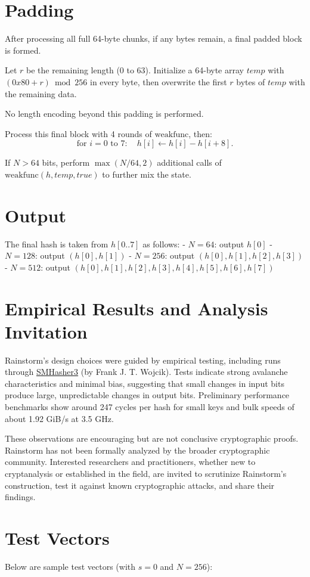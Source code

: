 \documentclass[11pt,a4paper]{article}
\begin{document}
\section*{Padding}
After processing all full 64-byte chunks, if any bytes remain, a final padded block is formed.

Let $r$ be the remaining length (0 to 63). Initialize a 64-byte array $temp$ with $(0x80 + r) \bmod 256$ in every byte, then overwrite the first $r$ bytes of $temp$ with the remaining data.

No length encoding beyond this padding is performed.

Process this final block with 4 rounds of $\text{weakfunc}$, then:
\[
\text{for } i=0 \text{ to } 7:\quad h[i] \leftarrow h[i] - h[i+8].
\]

If $N > 64$ bits, perform $\max(N/64, 2)$ additional calls of $\text{weakfunc}(h, temp, true)$ to further mix the state.

\section*{Output}
The final hash is taken from $h[0..7]$ as follows:
- $N=64$: output $h[0]$
- $N=128$: output $(h[0], h[1])$
- $N=256$: output $(h[0], h[1], h[2], h[3])$
- $N=512$: output $(h[0], h[1], h[2], h[3], h[4], h[5], h[6], h[7])$

\section*{Empirical Results and Analysis Invitation}
Rainstorm’s design choices were guided by empirical testing, including runs through \href{https://gitlab.com/fwojcik/smhasher3}{SMHasher3} (by Frank J. T. Wojcik). Tests indicate strong avalanche characteristics and minimal bias, suggesting that small changes in input bits produce large, unpredictable changes in output bits. Preliminary performance benchmarks show around 247 cycles per hash for small keys and bulk speeds of about 1.92 GiB/s at 3.5 GHz.

These observations are encouraging but are not conclusive cryptographic proofs. Rainstorm has not been formally analyzed by the broader cryptographic community. Interested researchers and practitioners, whether new to cryptanalysis or established in the field, are invited to scrutinize Rainstorm’s construction, test it against known cryptographic attacks, and share their findings.

\section*{Test Vectors}
Below are sample test vectors (with $s=0$ and $N=256$):
\end{document}
